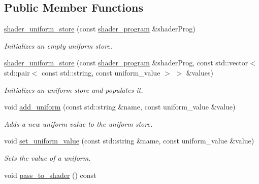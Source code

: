 \subsection*{Public Member Functions}
\begin{DoxyCompactItemize}
\item 
\hyperlink{classoccluded_1_1opengl_1_1retained_1_1shaders_1_1shader__uniform__store_a862db8afb99f17ec1b14c3e9a882618e}{shader\+\_\+uniform\+\_\+store} (const \hyperlink{classoccluded_1_1opengl_1_1retained_1_1shaders_1_1shader__program}{shader\+\_\+program} \&shader\+Prog)
\begin{DoxyCompactList}\small\item\em Initializes an empty uniform store. \end{DoxyCompactList}\item 
\hyperlink{classoccluded_1_1opengl_1_1retained_1_1shaders_1_1shader__uniform__store_a7503a430211c435021dbbe9628cb4e40}{shader\+\_\+uniform\+\_\+store} (const \hyperlink{classoccluded_1_1opengl_1_1retained_1_1shaders_1_1shader__program}{shader\+\_\+program} \&shader\+Prog, const std\+::vector$<$ std\+::pair$<$ const std\+::string, const uniform\+\_\+value $>$ $>$ \&values)
\begin{DoxyCompactList}\small\item\em Initializes an uniform store and populates it. \end{DoxyCompactList}\item 
void \hyperlink{classoccluded_1_1opengl_1_1retained_1_1shaders_1_1shader__uniform__store_a3fb24f0d04b2f34c2013f9c272ba662b}{add\+\_\+uniform} (const std\+::string \&name, const uniform\+\_\+value \&value)
\begin{DoxyCompactList}\small\item\em Adds a new uniform value to the uniform store. \end{DoxyCompactList}\item 
void \hyperlink{classoccluded_1_1opengl_1_1retained_1_1shaders_1_1shader__uniform__store_adc43de912769b10941eb93b407d8662d}{set\+\_\+uniform\+\_\+value} (const std\+::string \&name, const uniform\+\_\+value \&value)
\begin{DoxyCompactList}\small\item\em Sets the value of a uniform. \end{DoxyCompactList}\item 
void \hyperlink{classoccluded_1_1opengl_1_1retained_1_1shaders_1_1shader__uniform__store_a3b451f197b65ba65077a8d2d368bae41}{pass\+\_\+to\+\_\+shader} () const 

\end{DoxyCompactItemize}
